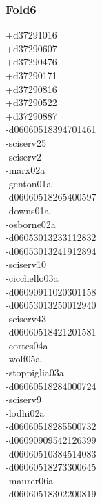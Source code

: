 \begin{multicols}{3}
\subsubsection*{Fold6}
+d37291016\\
+d37290607\\
+d37290476\\
+d37290171\\
+d37290816\\
+d37290522\\
+d37290887\\
-d06060518394701461\\
-sciserv25\\
-sciserv2\\
-marx02a\\
-genton01a\\
-d06060518265400597\\
-downs01a\\
-osborne02a\\
-d06053013233112832\\
-d06053013241912894\\
-sciserv10\\
-cicchello03a\\
-d06090911020301158\\
-d06053013250012940\\
-sciserv43\\
-d06060518421201581\\
-cortes04a\\
-wolf05a\\
-stoppiglia03a\\
-d06060518284000724\\
-sciserv9\\
-lodhi02a\\
-d06060518285500732\\
-d06090909542126399\\
-d06060510384514083\\
-d06060518273300645\\
-maurer06a\\
-d06060518302200819\\

\end{multicols}
